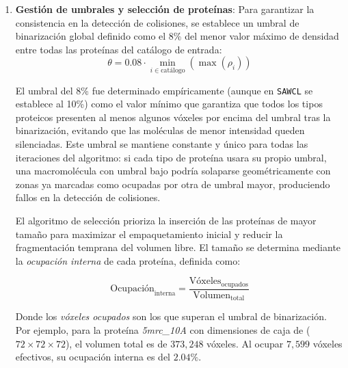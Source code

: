 \begin{enumerate}
    Este diseño produce un empaquetamiento en dos niveles: cuando la inserción es exitosa, el algoritmo continúa en la misma región (\textit{crecimiento local}), favoreciendo clústeres compactos; cuando falla, se muestrea una nueva semilla aleatoria del espacio global (\textit{reset global}), evitando que el algoritmo quede atrapado en zonas saturadas. El proceso finaliza al acumular $T_{cluster}$ fallos consecutivos para el tipo de proteína en curso, momento en el que el algoritmo pasa al siguiente tipo.

    \item \textbf{Gestión de umbrales y selección de proteínas}: Para garantizar la consistencia en la detección de colisiones, se establece un umbral de binarización global definido como el 8\%  del menor valor máximo de densidad entre todas las proteínas del catálogo de entrada:
    \begin{equation}
        \theta = 0.08 \cdot \min_{i \in \text{catálogo}} \left( \max(\rho_i) \right)
    \end{equation}
   
    El umbral del 8\% fue determinado empíricamente (aunque en \texttt{SAWCL} se establece al 10\%) como el valor mínimo que garantiza que todos los tipos proteicos presenten al menos algunos vóxeles por encima del umbral tras la binarización, evitando que las moléculas de menor intensidad queden silenciadas. Este umbral se mantiene constante y único para todas las iteraciones del algoritmo: si cada tipo de proteína usara su propio umbral, una macromolécula con umbral bajo podría solaparse geométricamente con zonas ya marcadas como ocupadas por otra de umbral mayor, produciendo fallos en la detección de colisiones.
    
    El algoritmo de selección prioriza la inserción de las proteínas de mayor tamaño para maximizar el empaquetamiento inicial y reducir la fragmentación temprana del volumen libre. El tamaño se determina mediante la \textit{ocupación interna} de cada proteína, definida como:

    \begin{equation}
        \text{Ocupación}_{\text{interna}} = \frac{\text{Vóxeles}_{\text{ocupados}}}{\text{Volumen}_{\text{total}}}
    \end{equation}

    Donde los \textit{vóxeles ocupados} son los que superan el umbral de binarización. Por ejemplo, para la proteína \textit{5mrc\_10A} con dimensiones de caja de ($72 \times 72 \times 72$), el volumen total es de $373{,}248$ vóxeles. Al ocupar $7{,}599$  vóxeles efectivos, su ocupación interna es del $2.04\%$.


\end{enumerate}

